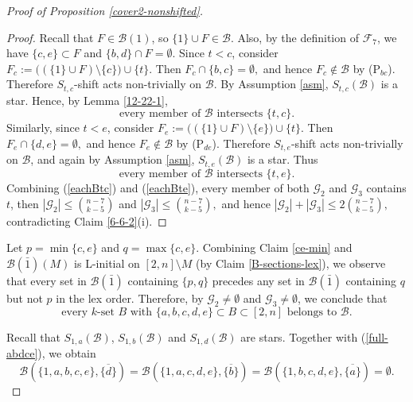 \documentclass[a4paper,11pt]{article}
\newcommand{\m}{\mathcal}
\begin{document}
\begin{proof}[Proof of Proposition \ref{cover2-nonshifted}]
\begin{proof}
Recall that $F\in\mathcal B(1)$, so $\{1\}\cup F\in\mathcal B$. Also,
by the definition of $\mathcal F_7$, we have
$\{c,e\}\subset F$ and $\{b,d\}\cap F=\emptyset.$
Since $t<c$, consider
$F_c:=\bigl((\{1\}\cup F)\setminus\{c\}\bigr)\cup\{t\}.$
Then
$F_c\cap\{b,c\}=\emptyset,$
and hence $F_c\notin\mathcal B$ by (P$_{bc}$). Therefore
$S_{t,c}$-shift acts non-trivially on $\mathcal B$. By Assumption \ref{asm},
$S_{t,c}(\mathcal B)$ is a star. Hence, by Lemma \ref{12-22-1}, 
\begin{equation}\label{eachBtc}
\text{every member of $\mathcal B$ intersects $\{t,c\}$.}  
\end{equation}
Similarly, since $t<e$, consider
$F_e:=\bigl((\{1\}\cup F)\setminus\{e\}\bigr)\cup\{t\}.$
Then
$F_e\cap\{d,e\}=\emptyset,$
and hence $F_e\notin\mathcal B$ by (P$_{de}$). Therefore
$S_{t,e}$-shift acts non-trivially on $\mathcal B$, and again by
Assumption \ref{asm}, $S_{t,e}(\mathcal B)$ is a star. Thus 
\begin{equation}\label{eachBte}
\text{every member of $\mathcal B$ intersects $\{t,e\}$.}
\end{equation}
Combining (\ref{eachBtc}) and (\ref{eachBte}), every member of both
$\mathcal G_2$ and $\mathcal G_3$ contains $t$, then
$|\mathcal G_2|\le {n-7\choose k-5}$ and $|\mathcal G_3|\le {n-7\choose k-5},$
and hence $|\mathcal G_2|+|\mathcal G_3|\le 2{n-7\choose k-5},$
contradicting Claim \ref{6-6-2}(i).
\end{proof}

Let $p=\min \{c,e\}$ and $q=\max \{c,e\}$.
Combining Claim \ref{ce-min} and $\m B(\bar 1)(M)$ is L-initial on $[2,n]\setminus M$ (by Claim \ref{B-sections-lex}), we observe that every set in $\m B(\bar1)$ containing $\{p,q\}$ precedes
any set in $\m B(\bar1)$ containing $q$ but not $p$ in the lex order. Therefore, by $\m G_2\ne \emptyset$ and $\m G_3\ne \emptyset$, we conclude that 
\begin{equation}\label{full-abdce}
\text{every $k$-set $B$ with $\{a,b,c,d,e\}\subset B\subset [2,n]$ belongs to $\mathcal B$.}
\end{equation}


Recall that $S_{1,a}(\m B)$, $S_{1,b}(\m B)$ and  $S_{1,d}(\m B)$ are stars. Together with (\ref{full-abdce}), we obtain
\begin{equation}\label{2-23-1}
\m B(\{1,a,b,c,e\},\overline{\{d\}})=\m B(\{1,a,c,d,e\},\overline{\{b\}})=\m B(\{1,b,c,d,e\},\overline{\{a\}})=\emptyset.
\end{equation}



\end{proof}
\end{document}
